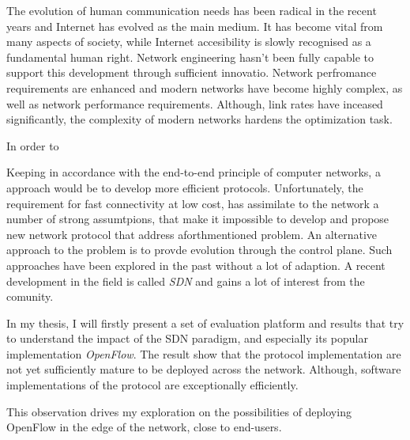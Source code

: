 


\begin{abstracts}        %
 
The evolution of human communication needs has been radical in the recent years and Internet
has evolved as the main medium. It has become vital from many aspects of society, while Internet
accesibility is slowly recognised as a fundamental human right. Network engineering hasn't
been fully capable to support this development through sufficient innovatio. Network perfromance 
requirements are enhanced and modern networks have
become highly complex, as well as network performance requirements.  Although, link rates
have inceased significantly, the complexity of modern networks hardens the optimization
task. 

In order to 

Keeping in accordance with the  end-to-end principle of computer networks, a approach
would be to develop more efficient protocols. Unfortunately, the requirement for fast
connectivity at low cost, has assimilate to the network a number of strong assumtpions,
that make it impossible to develop and propose new network protocol that address
aforthmentioned problem. An alternative approach to the problem is to provde evolution
through the control plane. Such approaches have been explored in the past without a lot of
adaption. A recent development in the field is called {\it SDN} and gains a lot of
interest from the comunity. 

In my thesis, I will firstly present a set of evaluation platform and results that try to
understand the impact of the SDN paradigm, and especially its popular implementation {\it
OpenFlow}. The result show that the protocol implementation are not yet sufficiently
mature to be deployed across the network. Although, software implementations of the
protocol are exceptionally efficiently. 

This observation drives my exploration on the possibilities of deploying OpenFlow in the
edge of the network, close to end-users. 




\end{abstracts}





